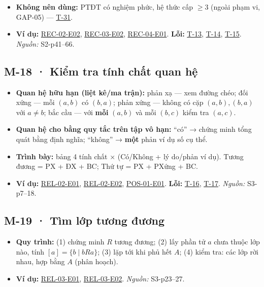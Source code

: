 \documentclass[
  10pt,
  twoside,openany]{book}
\providecommand{\tightlist}{%
  \setlength{\itemsep}{0pt}\setlength{\parskip}{0pt}}
\begin{document}
\begin{itemize}
\tightlist
\item
  \textbf{Không nên dùng:} PTĐT có nghiệm phức, hệ thức cấp \(\ge3\)
  (ngoài phạm vi, GAP-05) --- \protect\hyperlink{T-31}{T-31}.
\item
  \textbf{Ví dụ:} \protect\hyperlink{REC-02-E02}{REC-02-E02},
  \protect\hyperlink{REC-03-E02}{REC-03-E02},
  \protect\hyperlink{REC-04-E01}{REC-04-E01}. \textbf{Lỗi:}
  \protect\hyperlink{T-13}{T-13}, \protect\hyperlink{T-14}{T-14},
  \protect\hyperlink{T-15}{T-15}. \emph{Nguồn:} S2-p41--66.
\end{itemize}

\hypertarget{M-18}{%
\subsection{M-18 · Kiểm tra tính chất quan hệ}\label{M-18}}

\begin{itemize}
\tightlist
\item
  \textbf{Quan hệ hữu hạn (liệt kê/ma trận):} phản xạ --- xem đường
  chéo; đối xứng --- mỗi \((a,b)\) có \((b,a)\); phản xứng --- không có
  cặp \((a,b),(b,a)\) với \(a\ne b\); bắc cầu --- với \textbf{mỗi}
  \((a,b)\) và mỗi \((b,c)\) kiểm tra \((a,c)\).
\item
  \textbf{Quan hệ cho bằng quy tắc trên tập vô hạn:} ``có'' → chứng minh
  tổng quát bằng định nghĩa; ``không'' → \textbf{một} phản ví dụ số cụ
  thể.
\item
  \textbf{Trình bày:} bảng 4 tính chất × (Có/Không + lý do/phản ví dụ).
  Tương đương = PX + ĐX + BC; Thứ tự = PX + PXứng + BC.
\item
  \textbf{Ví dụ:} \protect\hyperlink{REL-02-E01}{REL-02-E01},
  \protect\hyperlink{REL-02-E02}{REL-02-E02},
  \protect\hyperlink{POS-01-E01}{POS-01-E01}. \textbf{Lỗi:}
  \protect\hyperlink{T-16}{T-16}, \protect\hyperlink{T-17}{T-17}.
  \emph{Nguồn:} S3-p7--18.
\end{itemize}

\hypertarget{M-19}{%
\subsection{M-19 · Tìm lớp tương đương}\label{M-19}}

\begin{itemize}
\tightlist
\item
  \textbf{Quy trình:} (1) chứng minh \(R\) tương đương; (2) lấy phần tử
  \(a\) chưa thuộc lớp nào, tính \([a]=\{b\mid bRa\}\); (3) lặp tới khi
  phủ hết \(A\); (4) kiểm tra: các lớp rời nhau, hợp bằng \(A\) (phân
  hoạch).
\item
  \textbf{Ví dụ:} \protect\hyperlink{REL-03-E01}{REL-03-E01},
  \protect\hyperlink{REL-03-E02}{REL-03-E02}. \emph{Nguồn:} S3-p23--27.
\end{itemize}
\end{document}
